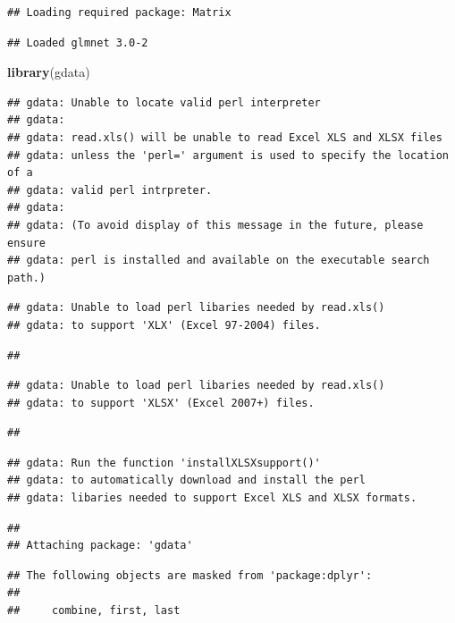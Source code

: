 \documentclass[
]{article}
\newenvironment{Shaded}{\begin{snugshade}}{\end{snugshade}}
\newcommand{\KeywordTok}[1]{\textcolor[rgb]{0.13,0.29,0.53}{\textbf{#1}}}
\newcommand{\NormalTok}[1]{#1}
\begin{document}
\begin{verbatim}
## Loading required package: Matrix
\end{verbatim}

\begin{verbatim}
## Loaded glmnet 3.0-2
\end{verbatim}

\begin{Shaded}
\begin{Highlighting}[]
\KeywordTok{library}\NormalTok{(gdata)}
\end{Highlighting}
\end{Shaded}

\begin{verbatim}
## gdata: Unable to locate valid perl interpreter
## gdata: 
## gdata: read.xls() will be unable to read Excel XLS and XLSX files
## gdata: unless the 'perl=' argument is used to specify the location of a
## gdata: valid perl intrpreter.
## gdata: 
## gdata: (To avoid display of this message in the future, please ensure
## gdata: perl is installed and available on the executable search path.)
\end{verbatim}

\begin{verbatim}
## gdata: Unable to load perl libaries needed by read.xls()
## gdata: to support 'XLX' (Excel 97-2004) files.
\end{verbatim}

\begin{verbatim}
## 
\end{verbatim}

\begin{verbatim}
## gdata: Unable to load perl libaries needed by read.xls()
## gdata: to support 'XLSX' (Excel 2007+) files.
\end{verbatim}

\begin{verbatim}
## 
\end{verbatim}

\begin{verbatim}
## gdata: Run the function 'installXLSXsupport()'
## gdata: to automatically download and install the perl
## gdata: libaries needed to support Excel XLS and XLSX formats.
\end{verbatim}

\begin{verbatim}
## 
## Attaching package: 'gdata'
\end{verbatim}

\begin{verbatim}
## The following objects are masked from 'package:dplyr':
## 
##     combine, first, last
\end{verbatim}
\end{document}

